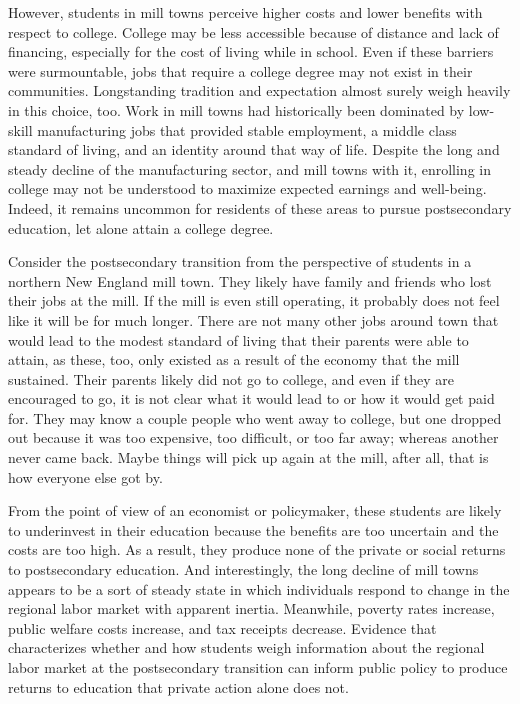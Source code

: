 \documentclass[12pt,letterpaper]{article}
\begin{document}
However, students in mill towns perceive higher costs and lower benefits with respect to college. College may be less accessible because of distance and lack of financing, especially for the cost of living while in school. Even if these barriers were surmountable, jobs that require a college degree may not exist in their communities. Longstanding tradition and expectation almost surely weigh heavily in this choice, too. Work in mill towns had historically been dominated by low-skill manufacturing jobs that provided stable employment, a middle class standard of living, and an identity around that way of life. Despite the long and steady decline of the manufacturing sector, and mill towns with it, enrolling in college may not be understood to maximize expected earnings and well-being. Indeed, it remains uncommon for residents of these areas to pursue postsecondary education, let alone attain a college degree.

Consider the postsecondary transition from the perspective of students in a northern New England mill town. They likely have family and friends who lost their jobs at the mill. If the mill is even still operating, it probably does not feel like it will be for much longer. There are not many other jobs around town that would lead to the modest standard of living that their parents were able to attain, as these, too, only existed as a result of the economy that the mill sustained. Their parents likely did not go to college, and even if they are encouraged to go, it is not clear what it would lead to or how it would get paid for. They may know a couple people who went away to college, but one dropped out because it was too expensive, too difficult, or too far away; whereas another never came back. Maybe things will pick up again at the mill, after all, that is how everyone else got by.

From the point of view of an economist or policymaker, these students are likely to underinvest in their education because the benefits are too uncertain and the costs are too high. As a result, they produce none of the private or social returns to postsecondary education. And interestingly, the long decline of mill towns appears to be a sort of steady state in which individuals respond to change in the regional labor market with apparent inertia. Meanwhile, poverty rates increase, public welfare costs increase, and tax receipts decrease. Evidence that characterizes whether and how students weigh information about the regional labor market at the postsecondary transition can inform public policy to produce returns to education that private action alone does not.
\end{document}
